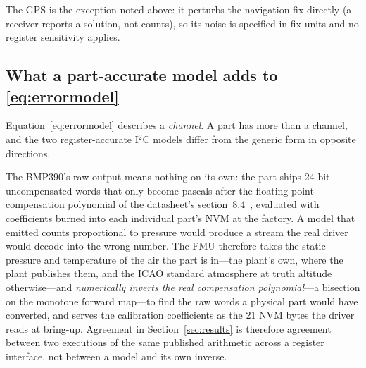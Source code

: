 \documentclass[preprint,12pt,a4paper]{elsarticle}
\begin{document}
The GPS is the exception noted above: it perturbs the navigation fix directly
(a receiver reports a solution, not counts), so its noise is specified in fix
units and no register sensitivity applies.

\subsection{What a part-accurate model adds to
\texorpdfstring{\eqref{eq:errormodel}}{the shared form}}
\label{sec:partmodels}
Equation~\eqref{eq:errormodel} describes a \emph{channel}. A part has more than
a channel, and the two register-accurate I$^2$C models differ from the generic
form in opposite directions.

The BMP390's raw output means nothing on its own: the part ships 24-bit
uncompensated words that only become pascals after the floating-point
compensation polynomial of the datasheet's section~8.4~\cite{bosch_bmp390},
evaluated with
coefficients burned into each individual part's NVM at the factory. A model that
emitted counts proportional to pressure would produce a stream the real driver
would decode into the wrong number. The FMU therefore takes the static
pressure and temperature of the air the part is in---the plant's own, where the
plant publishes them, and the ICAO standard atmosphere at truth altitude
otherwise---and \emph{numerically inverts the real
compensation polynomial}---a bisection on the monotone forward map---to find the
raw words a physical part would have converted, and serves the calibration
coefficients as the 21 NVM bytes the driver reads at bring-up. Agreement in
Section~\ref{sec:results} is therefore agreement between two executions of the
same published arithmetic across a register interface, not between a model and
its own inverse.
\end{document}
